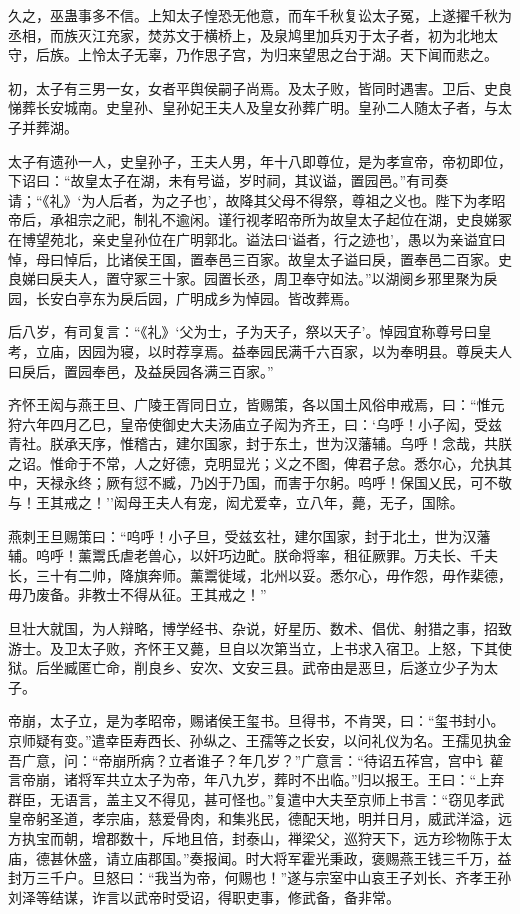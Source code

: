 \documentclass[]{article}
\begin{document}
久之，巫蛊事多不信。上知太子惶恐无他意，而车千秋复讼太子冤，上遂擢千秋为丞相，而族灭江充家，焚苏文于横桥上，及泉鸠里加兵刃于太子者，初为北地太守，后族。上怜太子无辜，乃作思子宫，为归来望思之台于湖。天下闻而悲之。

初，太子有三男一女，女者平舆侯嗣子尚焉。及太子败，皆同时遇害。卫后、史良悌葬长安城南。史皇孙、皇孙妃王夫人及皇女孙葬广明。皇孙二人随太子者，与太子并葬湖。

太子有遗孙一人，史皇孙子，王夫人男，年十八即尊位，是为孝宣帝，帝初即位，下诏曰：``故皇太子在湖，未有号谥，岁时祠，其议谥，置园邑。''有司奏请；``《礼》`为人后者，为之子也'，故降其父母不得祭，尊祖之义也。陛下为孝昭帝后，承祖宗之祀，制礼不逾闲。谨行视孝昭帝所为故皇太子起位在湖，史良娣冢在博望苑北，亲史皇孙位在广明郭北。谥法曰`谥者，行之迹也'，愚以为亲谥宜曰悼，母曰悼后，比诸侯王国，置奉邑三百家。故皇太子谥曰戾，置奉邑二百家。史良娣曰戾夫人，置守冢三十家。园置长丞，周卫奉守如法。''以湖阌乡邪里聚为戾园，长安白亭东为戾后园，广明成乡为悼园。皆改葬焉。

后八岁，有司复言：``《礼》`父为士，子为天子，祭以天子'。悼园宜称尊号曰皇考，立庙，因园为寝，以时荐享焉。益奉园民满千六百家，以为奉明县。尊戾夫人曰戾后，置园奉邑，及益戾园各满三百家。''

齐怀王闳与燕王旦、广陵王胥同日立，皆赐策，各以国土风俗申戒焉，曰：``惟元狩六年四月乙巳，皇帝使御史大夫汤庙立子闳为齐王，曰：`乌呼！小子闳，受兹青社。朕承天序，惟稽古，建尔国家，封于东土，世为汉藩辅。乌呼！念哉，共朕之诏。惟命于不常，人之好德，克明显光；义之不图，俾君子怠。悉尔心，允执其中，天禄永终；厥有愆不臧，乃凶于乃国，而害于尔躬。呜呼！保国乂民，可不敬与！王其戒之！''闳母王夫人有宠，闳尤爱幸，立八年，薨，无子，国除。

燕刺王旦赐策曰：``呜呼！小子旦，受兹玄社，建尔国家，封于北土，世为汉藩辅。呜呼！薰鬻氏虐老兽心，以奸巧边甿。朕命将率，租征厥罪。万夫长、千夫长，三十有二帅，降旗奔师。薰鬻徙域，北州以妥。悉尔心，毋作怨，毋作棐德，毋乃废备。非教士不得从征。王其戒之！''

旦壮大就国，为人辩略，博学经书、杂说，好星历、数术、倡优、射猎之事，招致游士。及卫太子败，齐怀王又薨，旦自以次第当立，上书求入宿卫。上怒，下其使狱。后坐臧匿亡命，削良乡、安次、文安三县。武帝由是恶旦，后遂立少子为太子。

帝崩，太子立，是为孝昭帝，赐诸侯王玺书。旦得书，不肯哭，曰：``玺书封小。京师疑有变。''遣幸臣寿西长、孙纵之、王孺等之长安，以问礼仪为名。王孺见执金吾广意，问：``帝崩所病？立者谁子？年几岁？''广意言：``待诏五莋宫，宫中讠雚言帝崩，诸将军共立太子为帝，年八九岁，葬时不出临。''归以报王。王曰：``上弃群臣，无语言，盖主又不得见，甚可怪也。''复遣中大夫至京师上书言：``窃见孝武皇帝躬圣道，孝宗庙，慈爱骨肉，和集兆民，德配天地，明并日月，威武洋溢，远方执宝而朝，增郡数十，斥地且倍，封泰山，禅梁父，巡狩天下，远方珍物陈于太庙，德甚休盛，请立庙郡国。''奏报闻。时大将军霍光秉政，褒赐燕王钱三千万，益封万三千户。旦怒曰：``我当为帝，何赐也！''遂与宗室中山哀王子刘长、齐孝王孙刘泽等结谋，诈言以武帝时受诏，得职吏事，修武备，备非常。
\end{document}
